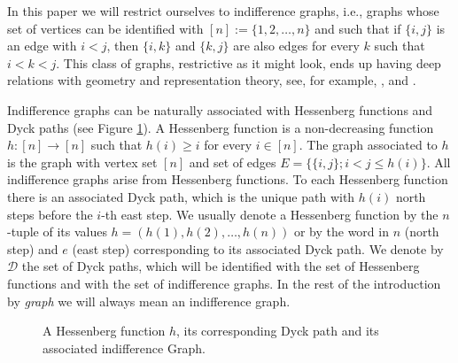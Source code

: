 \documentclass[10pt]{amsart}
\theoremstyle{definition}
\newcommand{\col}{\colon}
\newcommand{\D}{\mathcal{D}}
\newcommand{\dyckpath}[2]{
\draw[line width=2pt] (#1) foreach \dir in {#2}{ -- ++(\dir*90:1)};
}
\begin{document}
       In this paper we will restrict ourselves to indifference graphs, i.e., graphs whose set of vertices can be identified with $[n]:=\{1,2,\ldots, n\}$ and such that  if $\{i,j\}$ is an edge with $i<j$, then $\{i,k\}$ and $\{k,j\}$ are also edges for every $k$ such that $i<k<j$. This class of graphs, restrictive as it might look, ends up having deep relations with geometry and representation theory, see, for example, \cite{BrosnanChow}, \cite{GP} and \cite{abe2019}. \par

       Indifference graphs can be naturally associated with Hessenberg functions and Dyck paths (see Figure \ref{fig:fig1}). A Hessenberg function is a non-decreasing function $h\col [n]\to[n]$ such that $h(i)\geq i$ for every $i\in [n]$. The graph associated to $h$ is the graph with vertex set $[n]$ and set of edges $E=\{\{i,j\};i<j\leq h(i)\}$. All indifference graphs arise from Hessenberg functions. To each Hessenberg function there is an associated Dyck path, which is the unique path with $h(i)$ north steps before the $i$-th east step.  We usually denote a Hessenberg function by the $n$-tuple of its values $h=(h(1),h(2),\ldots, h(n))$ or by the word in $n$ (north step) and $e$ (east step) corresponding to its associated Dyck path.  We denote by $\D$ the set of Dyck paths, which will be identified with the set of Hessenberg functions and with the set of indifference graphs. In the rest of the introduction by \emph{graph} we will always mean an indifference graph.
       \begin{figure}[htb]  \centering
        \caption{A Hessenberg function $h$, its corresponding Dyck path and its associated indifference Graph.}
       \label{fig:fig1}
   \end{figure}
\end{document}
